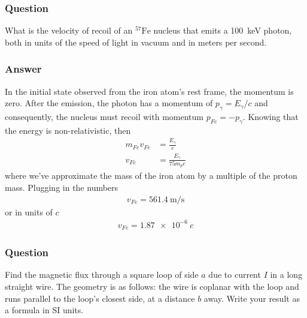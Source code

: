 \subsubsection{Question}

What is the velocity of recoil of an ${}^{57}\mathrm{Fe}$ nucleus that emits
a \SI{100}{\keV} photon, both in units of the speed of light in vacuum and in
meters per second.

\subsubsection{Answer}

In the initial state observed from the iron atom's rest frame, the momentum
is zero. After the emission, the photon has a momentum of $p_γ = E_γ/c$ and
consequently, the nucleus must recoil with momentum $p_{Fe} = -p_γ$. Knowing
that the energy is non-relativistic, then
\begin{align*}
    m_{Fe}v_{Fe} &= \frac{E_γ}{c} \\
    v_{Fe} &= \frac{E_γ}{75m_p c}
\end{align*}
where we've approximate the mass of the iron atom by a multiple of the proton
mass. Plugging in the numbers
\begin{align}
    \boxed{ v_{Fe} = \SI{561.4}{\m\per\s} }
\end{align}
or in units of $c$
\begin{align}
    \boxed{ v_{Fe} = \SI{1.87e-6}{c} }
\end{align}

\subsubsection{Question}

Find the magnetic flux through a square loop of side $a$ due to current $I$ in
a long straight wire. The geometry is as follows: the wire is coplanar with the
loop and runs parallel to the loop's closest side, at a distance $b$ away.
Write your result as a formula in SI units.

